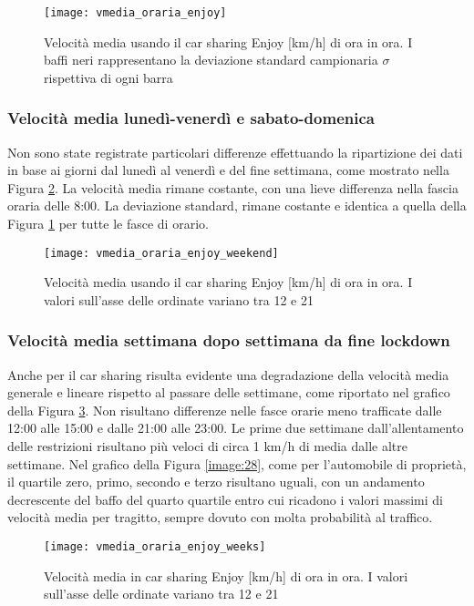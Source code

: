 \begin{figure}[H]
	\centering
	\texttt{[image: vmedia\_oraria\_enjoy]}
	\caption{Velocità media usando il car sharing Enjoy [km/h] di ora in ora.  I baffi neri rappresentano la deviazione standard campionaria $\sigma$ rispettiva di ogni barra}
	\label{image:7}
\end{figure}

\subsubsection{Velocità media lunedì-venerdì e sabato-domenica}

Non sono state registrate particolari differenze effettuando la ripartizione dei dati in base ai giorni dal lunedì al venerdì e del fine settimana, come mostrato nella Figura \ref{image:20}. La velocità media rimane costante, con una lieve differenza nella fascia oraria delle 8:00. La deviazione standard, rimane costante e identica a quella della Figura \ref{image:7} per tutte le fasce di orario.

\begin{figure}[H]
	\centering
	\texttt{[image: vmedia\_oraria\_enjoy\_weekend]}
	\caption{Velocità media usando il car sharing Enjoy [km/h] di ora in ora. I valori sull'asse delle ordinate variano tra 12 e 21}
	\label{image:20}
\end{figure}



\subsubsection{Velocità media settimana dopo settimana da fine lockdown}

Anche per il car sharing risulta evidente una degradazione della velocità media generale e lineare rispetto al passare delle settimane, come riportato nel grafico della Figura \ref{image:16}. Non risultano differenze nelle fasce orarie meno trafficate dalle 12:00 alle 15:00 e dalle 21:00 alle 23:00. Le prime due settimane dall'allentamento delle restrizioni risultano più veloci di circa 1 km/h di media dalle altre settimane. Nel grafico della Figura \ref{image:28}, come per l'automobile di proprietà, il quartile zero, primo, secondo e terzo risultano uguali, con un andamento decrescente del baffo del quarto quartile entro cui ricadono i valori massimi di velocità media per tragitto, sempre dovuto con molta probabilità al traffico.

\begin{figure}[H]
	\centering
	\texttt{[image: vmedia\_oraria\_enjoy\_weeks]}
	\caption{Velocità media in car sharing Enjoy [km/h] di ora in ora. I valori sull'asse delle ordinate variano tra 12 e 21}
	\label{image:16}
\end{figure}

